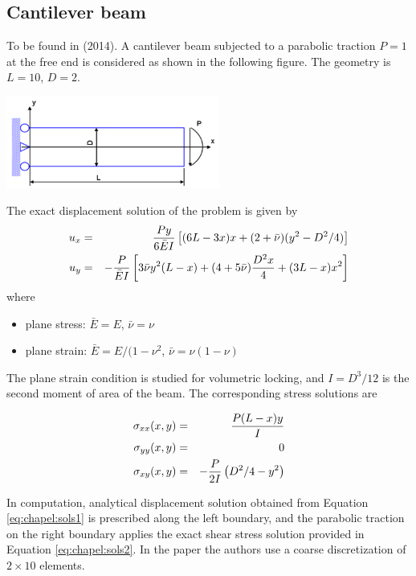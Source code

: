 \subsection{Cantilever beam}

To be found in \textcite{zhwc14} (2014). 
A cantilever beam subjected to a parabolic traction $P=1$ at the free end is considered as shown in
the following figure. The geometry is $L=10$, $D=2$.

\begin{center}
\includegraphics[width=7cm]{images/chapter_elasticity/cantilever_beam}
\end{center}

The exact displacement solution of the problem is given by
\begin{eqnarray}
u_x&=& \frac{Py}{6 \bar{E} I} \left[
(6L-3x)x+(2+\bar{\nu})(y^2-D^2/4)\right] \nonumber\\
u_y&=&-\frac{P}{\bar{E} I} \left[
3\bar{\nu}y^2(L-x)+(4+5\bar{\nu}) \frac{D^2x}{4}+(3L-x)x^2 \right] \label{eq:chapel:sols1}
\end{eqnarray}
where 
\begin{itemize}
\item plane stress: $\bar{E}=E$, $\bar{\nu}=\nu$
\item plane strain: $\bar{E}=E/(1-\nu^2$, $\bar{\nu}=\nu(1-\nu)$
\end{itemize}
The plane strain condition is studied for volumetric locking, and $I=D^3/12$ is the second
moment of area of the beam. The corresponding stress solutions are

\begin{eqnarray}
\sigma_{xx}(x,y)&=&\frac{P(L-x)y}{I} \nonumber\\
\sigma_{yy}(x,y)&=&0 \nonumber\\
\sigma_{xy}(x,y)&=&-\frac{P}{2I}\left( D^2/4 - y^2 \right) \label{eq:chapel:sols2}
\end{eqnarray}

In computation, analytical displacement solution obtained from Equation \eqref{eq:chapel:sols1}
is prescribed along the left boundary, and the parabolic traction 
on the right boundary applies the exact shear stress
solution provided in Equation \eqref{eq:chapel:sols2}. 
In the paper the authors use a coarse discretization of $2\times 10$ elements.

